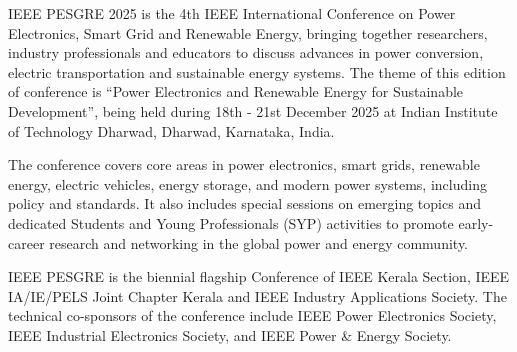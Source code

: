 
IEEE PESGRE 2025 is the 4th IEEE International Conference on Power Electronics, Smart Grid and Renewable Energy, bringing together researchers, industry professionals and educators to discuss advances in power conversion, electric transportation and sustainable energy systems. The theme of this edition of conference is “Power Electronics and Renewable Energy for Sustainable Development”, being held during 18th - 21st December 2025 at Indian Institute of Technology Dharwad, Dharwad, Karnataka, India.

The conference covers core areas in power electronics, smart grids, renewable energy, electric vehicles, energy storage, and modern power systems, including policy and standards. It also includes special sessions on emerging topics and dedicated Students and Young Professionals (SYP) activities to promote early-career research and networking in the global power and energy community.

IEEE PESGRE is the biennial flagship Conference of IEEE Kerala Section, IEEE IA/IE/PELS Joint Chapter Kerala and IEEE Industry Applications Society. The technical co-sponsors of the conference include IEEE Power Electronics Society, IEEE Industrial Electronics Society, and IEEE Power \& Energy Society.

\clearpage
